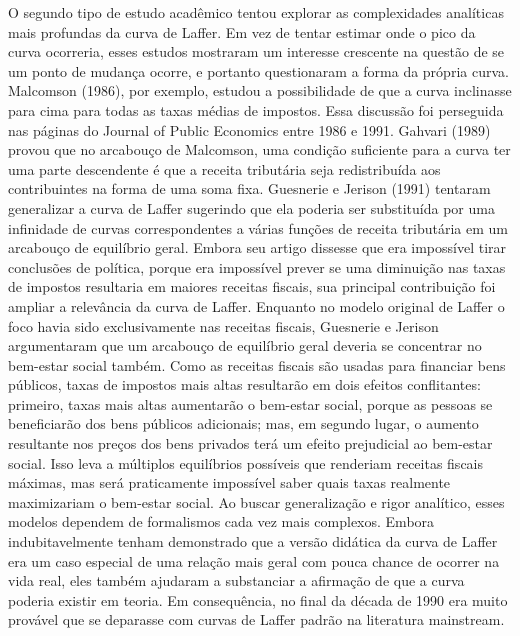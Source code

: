 \documentclass[12pt]{article}
\begin{document}
O segundo tipo de estudo acadêmico tentou explorar as complexidades analíticas mais profundas da curva de Laffer. Em vez de tentar estimar onde o pico da curva ocorreria, esses estudos mostraram um interesse crescente na questão de se um ponto de mudança ocorre, e portanto questionaram a forma da própria curva. Malcomson (1986), por exemplo, estudou a possibilidade de que a curva inclinasse para cima para todas as taxas médias de impostos. Essa discussão foi perseguida nas páginas do Journal of Public Economics entre 1986 e 1991. Gahvari (1989) provou que no arcabouço de Malcomson, uma condição suficiente para a curva ter uma parte descendente é que a receita tributária seja redistribuída aos contribuintes na forma de uma soma fixa. Guesnerie e Jerison (1991) tentaram generalizar a curva de Laffer sugerindo que ela poderia ser substituída por uma infinidade de curvas correspondentes a várias funções de receita tributária em um arcabouço de equilíbrio geral. Embora seu artigo dissesse que era impossível tirar conclusões de política, porque era impossível prever se uma diminuição nas taxas de impostos resultaria em maiores receitas fiscais, sua principal contribuição foi ampliar a relevância da curva de Laffer. Enquanto no modelo original de Laffer o foco havia sido exclusivamente nas receitas fiscais, Guesnerie e Jerison argumentaram que um arcabouço de equilíbrio geral deveria se concentrar no bem-estar social também. Como as receitas fiscais são usadas para financiar bens públicos, taxas de impostos mais altas resultarão em dois efeitos conflitantes: primeiro, taxas mais altas aumentarão o bem-estar social, porque as pessoas se beneficiarão dos bens públicos adicionais; mas, em segundo lugar, o aumento resultante nos preços dos bens privados terá um efeito prejudicial ao bem-estar social. Isso leva a múltiplos equilíbrios possíveis que renderiam receitas fiscais máximas, mas será praticamente impossível saber quais taxas realmente maximizariam o bem-estar social. Ao buscar generalização e rigor analítico, esses modelos dependem de formalismos cada vez mais complexos. Embora indubitavelmente tenham demonstrado que a versão didática da curva de Laffer era um caso especial de uma relação mais geral com pouca chance de ocorrer na vida real, eles também ajudaram a substanciar a afirmação de que a curva poderia existir em teoria. Em consequência, no final da década de 1990 era muito provável que se deparasse com curvas de Laffer padrão na literatura mainstream.
\end{document}
